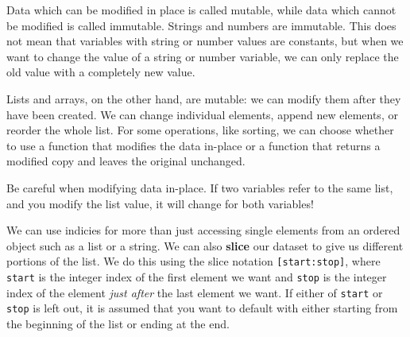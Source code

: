 \documentclass[
  letterpaper,
  DIV=11,
  numbers=noendperiod]{scrreprt}
\begin{document}
\begin{tcolorbox}[enhanced jigsaw, rightrule=.15mm, opacitybacktitle=0.6, colback=white, toprule=.15mm, colframe=quarto-callout-tip-color-frame, bottomtitle=1mm, bottomrule=.15mm, arc=.35mm, coltitle=black, breakable, title=\textcolor{quarto-callout-tip-color}{\faLightbulb}\hspace{0.5em}{Mutable vs Immutable}, titlerule=0mm, opacityback=0, colbacktitle=quarto-callout-tip-color!10!white, left=2mm, toptitle=1mm, leftrule=.75mm]
Data which can be modified in place is called mutable, while data which
cannot be modified is called immutable. Strings and numbers are
immutable. This does not mean that variables with string or number
values are constants, but when we want to change the value of a string
or number variable, we can only replace the old value with a completely
new value.

Lists and arrays, on the other hand, are mutable: we can modify them
after they have been created. We can change individual elements, append
new elements, or reorder the whole list. For some operations, like
sorting, we can choose whether to use a function that modifies the data
in-place or a function that returns a modified copy and leaves the
original unchanged.

Be careful when modifying data in-place. If two variables refer to the
same list, and you modify the list value, it will change for both
variables!
\end{tcolorbox}

We can use indicies for more than just accessing single elements from an
ordered object such as a list or a string. We can also \textbf{slice}
our dataset to give us different portions of the list. We do this using
the slice notation \texttt{{[}start:stop{]}}, where \texttt{start} is
the integer index of the first element we want and \texttt{stop} is the
integer index of the element \emph{just after} the last element we want.
If either of \texttt{start} or \texttt{stop} is left out, it is assumed
that you want to default with either starting from the beginning of the
list or ending at the end.
\end{document}
